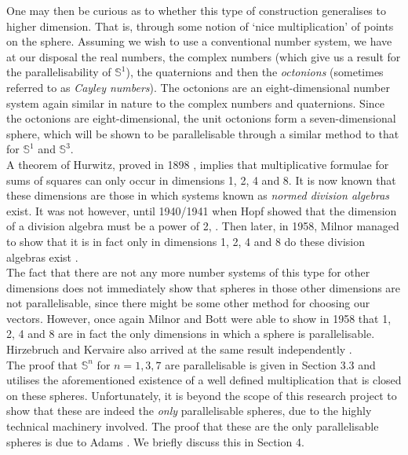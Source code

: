 \documentclass[12pt,a4paper]{article}
\begin{document}
One may then be curious as to whether this type of construction generalises to higher dimension. That is, through some notion of `nice multiplication' of points on the sphere. Assuming we wish to use a conventional number system, we have at our disposal the real numbers, the complex numbers (which give us a result for the parallelisability of $\mathbb{S}^1$), the quaternions and then the \textit{octonions} (sometimes referred to as \textit{Cayley numbers}). The octonions are an eight-dimensional number system again similar in nature to the complex numbers and quaternions. Since the octonions are eight-dimensional, the unit octonions form a seven-dimensional sphere, which will be shown to be parallelisable through a similar method to that for $\mathbb{S}^1$ and $\mathbb{S}^3$.\\
 
A theorem of Hurwitz, proved in 1898 \cite{Hurwitz1898,Hurwitz1923}, implies that multiplicative formulae for sums of squares can only occur in dimensions 1, 2, 4 and 8. It is now known that these dimensions are those in which systems known as \textit{normed division algebras} exist. It was not however, until 1940/1941 when Hopf showed that the dimension of a division algebra must be a power of 2, \cite{MR0004785}. Then later, in 1958, Milnor managed to show that it is in fact only in dimensions 1, 2, 4 and 8 do these division algebras exist \cite{MR0102805}.\\

The fact that there are not any more number systems of this type for other dimensions does not immediately show that spheres in those other dimensions are not parallelisable, since there might be some other method for choosing our vectors. However, once again Milnor and Bott \cite{MR0102804} were able to show in 1958 that 1, 2, 4 and 8 are in fact the only dimensions in which a sphere is parallelisable. Hirzebruch and Kervaire also arrived at the same result independently \cite{MR1415833,MR3075371,atiyah1961bott}.\\

The proof that $\mathbb{S}^n$ for $n=1,3,7$ are parallelisable is given in Section 3.3 and utilises the aforementioned existence of a well defined multiplication that is closed on these spheres. Unfortunately, it is beyond the scope of this research project to show that these are indeed the \textit{only} parallelisable spheres, due to the highly technical machinery involved. The proof that these are the only parallelisable spheres is due to Adams \cite{MR0141119}. We briefly discuss this in Section 4.\\
\end{document}
